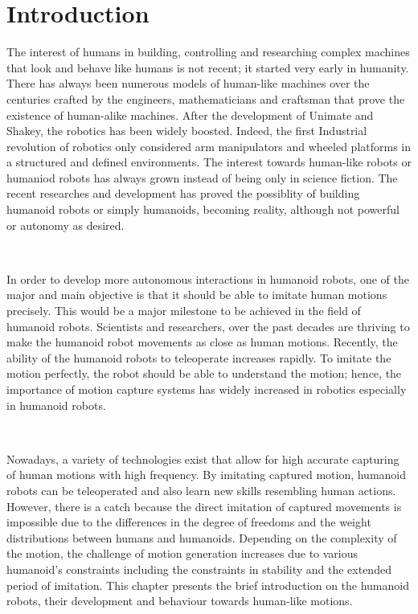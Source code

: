 \chapter{Introduction}

The interest of humans in building, controlling and researching complex machines that look and behave like humans is not 
recent; it started very early in humanity. There has always been numerous models of human-like machines over the centuries 
crafted by the engineers, mathematicians and craftsman that prove the existence of human-alike machines. After the development 
of Unimate and Shakey, the robotics has been widely boosted. Indeed, the first Industrial revolution of robotics only considered 
arm manipulators and wheeled platforms in a structured and defined environments. The interest towards human-like robots or humaniod 
robots has always grown instead of being only in science fiction. The recent researches and development has proved the possiblity
of building humanoid robots or simply humanoids, becoming reality, although not powerful or autonomy as desired. 

~

In order to develop more autonomous interactions in humanoid robots, one of the major and main objective is that it should
be able to imitate human motions precisely. This would be a major milestone to be achieved in the field of humanoid robots.
Scientists and researchers, over the past decades are thriving to make the humanoid robot movements as close as human 
motions. Recently, the ability of the humanoid robots to teleoperate increases rapidly. To imitate the motion perfectly,
the robot should be able to understand the motion; hence, the importance of motion capture systems has widely increased
in robotics especially in humanoid robots.

~

Nowadays, a variety of technologies exist that allow for high accurate capturing of human motions with high frequency. 
By imitating captured motion, humanoid robots can be teleoperated and also learn new skills resembling human actions. 
However, there is a catch because the direct imitation of captured movements is impossible due to the differences in 
the degree of freedoms and the weight distributions between humans and humanoids. Depending on the complexity of the 
motion, the challenge of motion generation increases due to various humanoid's constraints including the constraints in 
stability and the extended period of imitation. This chapter presents the brief introduction on the humanoid robots, 
their development and behaviour towards human-like motions.


